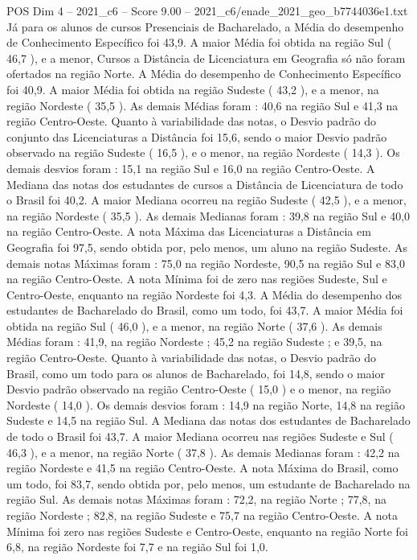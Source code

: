 \begin{textsample}{POS Dim 4 – 2021\_c6 – Score 9.00 – 2021\_c6/enade\_2021\_geo\_b7744036e1.txt}
Já para os alunos de cursos Presenciais de Bacharelado, a Média do desempenho de Conhecimento Específico foi 43,9.
A maior Média foi obtida na região Sul ( 46,7 ), e a menor, Cursos a Distância de Licenciatura em Geografia só não foram ofertados na região Norte.
A Média do desempenho de Conhecimento Específico foi 40,9.
A maior Média foi obtida na região Sudeste ( 43,2 ), e a menor, na região Nordeste ( 35,5 ).
As demais Médias foram : 40,6 na região Sul e 41,3 na região Centro-Oeste.
Quanto à variabilidade das notas, o Desvio padrão do conjunto das Licenciaturas a Distância foi 15,6, sendo o maior Desvio padrão observado na região Sudeste ( 16,5 ), e o menor, na região Nordeste ( 14,3 ).
Os demais desvios foram : 15,1 na região Sul e 16,0 na região Centro-Oeste.
A Mediana das notas dos estudantes de cursos a Distância de Licenciatura de todo o Brasil foi 40,2.
A maior Mediana ocorreu na região Sudeste ( 42,5 ), e a menor, na região Nordeste ( 35,5 ).
As demais Medianas foram : 39,8 na região Sul e 40,0 na região Centro-Oeste.
A nota Máxima das Licenciaturas a Distância em Geografia foi 97,5, sendo obtida por, pelo menos, um aluno na região Sudeste.
As demais notas Máximas foram : 75,0 na região Nordeste, 90,5 na região Sul e 83,0 na região Centro-Oeste.
A nota Mínima foi de zero nas regiões Sudeste, Sul e Centro-Oeste, enquanto na região Nordeste foi 4,3.
A Média do desempenho dos estudantes de Bacharelado do Brasil, como um todo, foi 43,7.
A maior Média foi obtida na região Sul ( 46,0 ), e a menor, na região Norte ( 37,6 ).
As demais Médias foram : 41,9, na região Nordeste ; 45,2 na região Sudeste ; e 39,5, na região Centro-Oeste.
Quanto à variabilidade das notas, o Desvio padrão do Brasil, como um todo para os alunos de Bacharelado, foi 14,8, sendo o maior Desvio padrão observado na região Centro-Oeste ( 15,0 ) e o menor, na região Nordeste ( 14,0 ).
Os demais desvios foram : 14,9 na região Norte, 14,8 na região Sudeste e 14,5 na região Sul.
A Mediana das notas dos estudantes de Bacharelado de todo o Brasil foi 43,7.
A maior Mediana ocorreu nas regiões Sudeste e Sul ( 46,3 ), e a menor, na região Norte ( 37,8 ).
As demais Medianas foram : 42,2 na região Nordeste e 41,5 na região Centro-Oeste.
A nota Máxima do Brasil, como um todo, foi 83,7, sendo obtida por, pelo menos, um estudante de Bacharelado na região Sul.
As demais notas Máximas foram : 72,2, na região Norte ; 77,8, na região Nordeste ; 82,8, na região Sudeste e 75,7 na região Centro-Oeste.
A nota Mínima foi zero nas regiões Sudeste e Centro-Oeste, enquanto na região Norte foi 6,8, na região Nordeste foi 7,7 e na região Sul foi 1,0.

\end{textsample}
